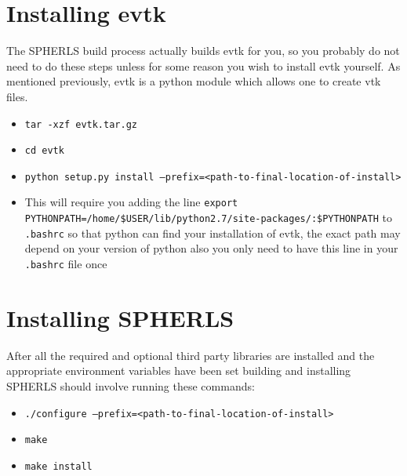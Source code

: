 \documentclass[12pt,a4paper]{book}
\begin{document}
\section{Installing evtk}
The SPHERLS build process actually builds evtk for you, so you probably do not need to do these steps unless for some reason you wish to install evtk yourself. As mentioned previously, evtk is a python module which allows one to create vtk files.
\begin{itemize}
\item {\tt tar -xzf evtk.tar.gz}
\item {\tt cd evtk}
\item {\tt  python setup.py install --prefix=<path-to-final-location-of-install>}
\item This will require you adding the line {\tt export PYTHONPATH\-=/home/\-\$USER/\-lib/\-python2.7/\-site-packages/\-:\$PYTHONPATH} to {\tt .bashrc} so that python can find your installation of evtk, the exact path may depend on your version of python also you only need to have this line in your {\tt .bashrc} file once
\end{itemize}


\section{Installing SPHERLS}
After all the required and optional third party libraries are installed and the appropriate environment variables have been set building and installing SPHERLS should involve running these commands:
\begin{itemize}
\item {\tt ./configure --prefix=<path-to-final-location-of-install>}
\item {\tt make}
\item {\tt make install}
\end{itemize}
\end{document}
